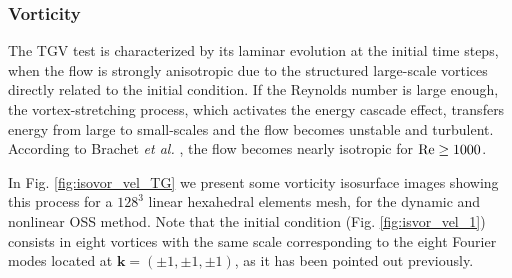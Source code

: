 \subsubsection{Vorticity}
The TGV test is characterized by its laminar evolution at the initial time steps, when the flow is strongly anisotropic due to the structured large-scale vortices directly related to the initial condition. If the Reynolds number is large enough, the vortex-stretching process, which activates the energy cascade effect, transfers energy from large to small-scales and the flow becomes unstable and turbulent. According to Brachet \emph{et al.} \cite{brachet_small-scale_1983}, the flow becomes nearly isotropic for ${\rm Re}\geq1000$.

In Fig. \ref{fig:isovor_vel_TG} we present some vorticity isosurface images showing this process for  a $128^3$ linear hexahedral elements mesh, for the dynamic and nonlinear OSS method. Note that the initial condition (Fig. \ref{fig:isvor_vel_1}) consists in eight vortices with the same scale corresponding to the eight Fourier modes located at $\mathbf{k}=(\pm1,\pm1,\pm1)$, as it has been pointed out previously.
